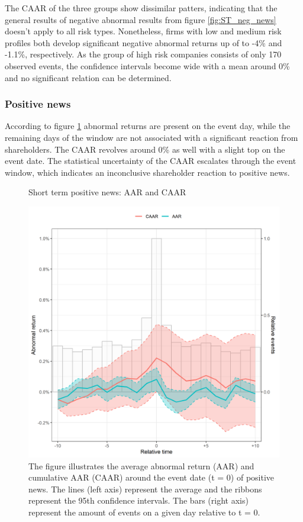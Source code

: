 The CAAR of the three groups show dissimilar patters, indicating that the general results of negative abnormal results from figure \ref{fig:ST_neg_news} doesn't apply to all risk types. Nonetheless, firms with low and medium risk profiles both develop significant negative abnormal returns up of to -4\% and -1.1\%, respectively. As the group of high risk companies consists of only 170 observed events, the confidence intervals become wide with a mean around 0\% and no significant relation can be determined. 



\subsubsection{Positive news}

According to figure \ref{fig:ST_pos_news} abnormal returns are present on the event day, while the remaining days of the window are not associated with a significant reaction from shareholders. The CAAR revolves around 0\% as well with a slight top on the event date. The statistical uncertainty of the CAAR escalates through the event window, which indicates an inconclusive shareholder reaction to positive news.    

\begin{figure} [H] 
    \centering
    \caption{Short term positive news: AAR and CAAR}
    \includegraphics[scale=0.6]{Projekt/1.Figures analysis/ST_positive_all_CI.png}
    \caption*{\footnotesize The figure illustrates the average abnormal return (AAR) and cumulative AAR (CAAR) around the event date (t = 0) of positive news. The lines (left axis) represent the average and the ribbons represent the 95th confidence intervals. The bars (right axis) represent the amount of events on a given day relative to t = 0. }
    \label{fig:ST_pos_news}
\end{figure}

